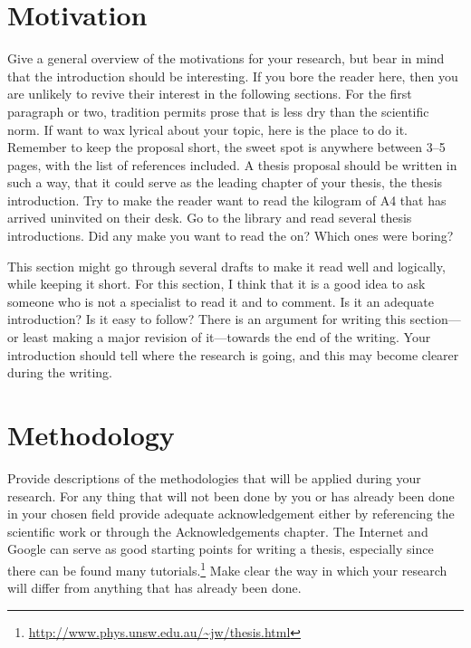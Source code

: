 \graphicspath{{img/}}











\section{Motivation}
Give a general overview of the motivations for your research, but bear in mind that the introduction should be interesting. If you bore the reader here, then you are unlikely to revive their interest in the following sections. For the first paragraph or two, tradition permits prose that is less dry than the scientific norm. If want to wax lyrical about your topic, here is the place to do it. Remember to keep the proposal short, the sweet spot is anywhere between 3--5 pages, with the list of references included. A thesis proposal should be written in such a way, that it could serve as the leading chapter of your thesis, the thesis introduction. Try to make the reader want to read the kilogram of A4 that has arrived uninvited on their desk. Go to the library and read several thesis introductions. Did any make you want to read the on? Which ones were boring? 

This section might go through several drafts to make it read well and logically, while keeping it short. For this section, I think that it is a good idea to ask someone who is not a specialist to read it and to comment. Is it an adequate introduction? Is it easy to follow? There is an argument for writing this section---or least making a major revision of it---towards the end of the writing. Your introduction should tell where the research is going, and this may become clearer during the writing. 

\section{Methodology}
Provide descriptions of the methodologies that will be applied during your research. For any thing that will not been done by you or has already been done in your chosen field provide adequate acknowledgement either by referencing the scientific work \cite{adami:1998, bentley:2002, reynolds:1978, reynolds:1987, lebar_bajec:2005a, lebar_bajec:2005b, heppner:1990} or through the Acknowledgements chapter. The Internet and Google can serve as good starting points for writing a thesis, especially since there can be found many tutorials.\footnote{\href{http://www.phys.unsw.edu.au/~jw/thesis.html}{http://www.phys.unsw.edu.au/\textasciitilde jw/thesis.html}} Make clear the way in which your research will differ from anything that has already been done.

